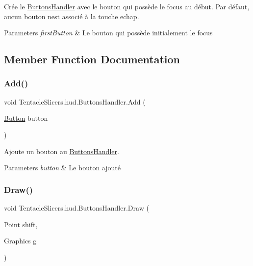 Crée le \hyperlink{class_tentacle_slicers_1_1hud_1_1_buttons_handler}{Buttons\+Handler} avec le bouton qui possède le focus au début. Par défaut, aucun bouton n\textquotesingle{}est associé à la touche echap. 


\begin{DoxyParams}{Parameters}
{\em first\+Button} & Le bouton qui possède initialement le focus \\
\hline
\end{DoxyParams}


\subsection{Member Function Documentation}
\mbox{\label{class_tentacle_slicers_1_1hud_1_1_buttons_handler_ad3a0cdf8322d6dfd4766970542fbbf53}} 
\subsubsection{\texorpdfstring{Add()}{Add()}}
{\footnotesize\ttfamily void Tentacle\+Slicers.\+hud.\+Buttons\+Handler.\+Add (\begin{DoxyParamCaption}\item[{\hyperlink{class_tentacle_slicers_1_1hud_1_1_button}{Button}}]{button }\end{DoxyParamCaption})}



Ajoute un bouton au \hyperlink{class_tentacle_slicers_1_1hud_1_1_buttons_handler}{Buttons\+Handler}. 


\begin{DoxyParams}{Parameters}
{\em button} & Le bouton ajouté \\
\hline
\end{DoxyParams}
\mbox{\label{class_tentacle_slicers_1_1hud_1_1_buttons_handler_a4fb37b6edf1c21cbbb53a96f11c6d3cc}} 
\subsubsection{\texorpdfstring{Draw()}{Draw()}}
{\footnotesize\ttfamily void Tentacle\+Slicers.\+hud.\+Buttons\+Handler.\+Draw (\begin{DoxyParamCaption}\item[{Point}]{shift,  }\item[{Graphics}]{g }\end{DoxyParamCaption})}



